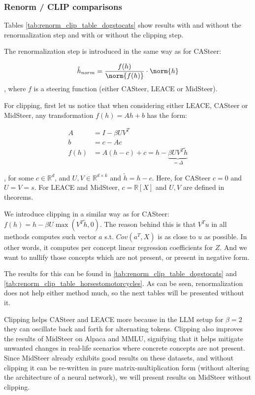 \subsubsection{Renorm / CLIP comparisons}

Tables \ref{tab:renorm_clip_table_dogstocats} show results with and without the renormalization step and with or without the clipping step.

The renormalization step is introduced in the same way as for CASteer:

\begin{align*}
    \hat{h}_{norm} = \frac{f(h)}{\norm{f(h)}} \cdot \norm{h}    
\end{align*}
, where $f$ is a steering function (either CASteer, LEACE or MidSteer).


For clipping, first let us notice that when considering either LEACE, CASteer or MidSteer, any transformation $f(h) = Ah + b$ has the form:

\begin{align*}
    A &= I - \beta U V^T \\
    b &= c - Ac \\
    f(h) &= A (h-c) + c = h - \underbrace{\beta UV^T \tilde{h}}_{=\Delta}
\end{align*}

, for some $c \in \mathbb{R}^d$, and $U, V \in \mathbb{R}^{d \times k}$ and $\tilde{h} = h - c$. Here, for CASteer $c=0$ and $U = V = s$. For LEACE and MidSteer, $c=\mathbb{R}[X]$ and $U, V$ are defined in theorems.

We introduce clipping in a similar way as for CASteer: $f(h) = h - \beta U \max(V^T \tilde{h}, 0)$. The reason behind this is that $V^T u$ in all methods computes such vector $a$ s.t. $Cov(a^T, X)$ is as close to $u$ as possible. In other words, it computes per concept linear regression coefficients for $Z$. And we want to nullify those concepts which are not present, or present in negative form.

The results for this can be found in \ref{tab:renorm_clip_table_dogstocats} and \ref{tab:renorm_clip_table_horsestomotorcycles}. As can be seen, renormalization does not help either method much, so the next tables will be presented without it.


Clipping helps CASteer and LEACE more because in the LLM setup for $\beta=2$ they can oscillate back and forth for alternating tokens. Clipping also improves the results of MidSteer on Alpaca and MMLU, signifying that it helps mitigate unwanted changes in real-life scenarios where concrete concepts are not present. Since MidSteer already exhibits good results on these datasets, and without clipping it can be re-written in pure matrix-multiplication form (without altering the architecture of a neural network), we will present results on MidSteer without clipping.

